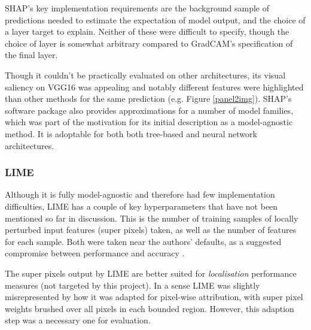 \documentclass[main]{subfiles}
\begin{document}
SHAP's key implementation requirements are the background sample of predictions needed to estimate the expectation of model output, and the choice of a layer target to explain. Neither of these were difficult to specify, though the choice of layer is somewhat arbitrary compared to GradCAM's specification of the final layer.

Though it couldn't be practically evaluated on other architectures, its visual saliency on VGG16 was appealing and notably different features were highlighted than other methods for the same prediction (e.g. Figure \ref{panel2img}). SHAP's software package also provides approximations for a number of model families, which was part of the motivation for its initial description as a model-agnostic method. It is adoptable for both both tree-based and neural network architectures.


\subsubsection{LIME}
Although it is fully model-agnostic and therefore had few implementation difficulties, LIME has a couple of key hyperparameters that have not been mentioned so far in discussion. This is the number of training samples of locally perturbed input features (super pixels) taken, as well as the number of features for each sample. Both were taken near the authors' defaults, as a suggested compromise between performance and accuracy \cite{limerepo}.

The super pixels output by LIME are better suited for \textit{localisation} performance measures (not targeted by this project). In a sense LIME was slightly misrepresented by how it was adapted for pixel-wise attribution, with super pixel weights brushed over all pixels in each bounded region. However, this adaption step was a necessary one for evaluation.
\end{document}
